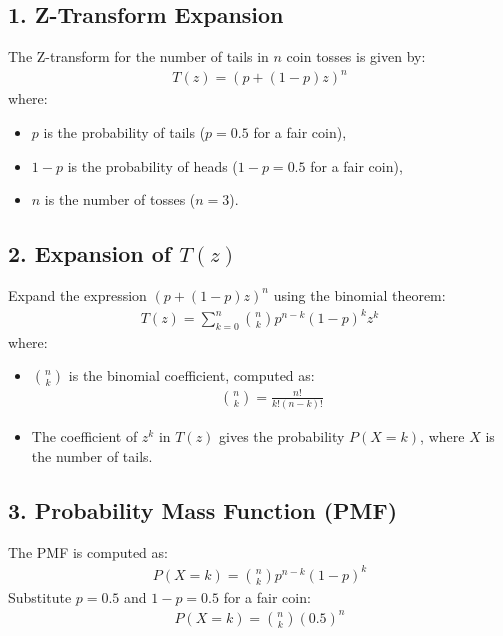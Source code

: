 \documentclass[journal]{IEEEtran}
\begin{document}
\subsection*{1. Z-Transform Expansion}
The Z-transform for the number of tails in \(n\) coin tosses is given by:
\begin{align}
T(z) = \left( p + (1-p)z \right)^n
\end{align}
where:
\begin{itemize}
    \item \(p\) is the probability of tails (\(p = 0.5\) for a fair coin),
    \item \(1-p\) is the probability of heads (\(1-p = 0.5\) for a fair coin),
    \item \(n\) is the number of tosses (\(n = 3\)).
\end{itemize}

\subsection*{2. Expansion of \(T(z)\)}
Expand the expression \(\left( p + (1-p)z \right)^n\) using the binomial theorem:
\begin{align}
T(z) = \sum_{k=0}^{n} \binom{n}{k} p^{n-k} (1-p)^k z^k
\end{align}
where:
\begin{itemize}
    \item \(\binom{n}{k}\) is the binomial coefficient, computed as:
    \begin{align}
    \binom{n}{k} = \frac{n!}{k! (n-k)!}
    \end{align}
    \item The coefficient of \(z^k\) in \(T(z)\) gives the probability \(P(X = k)\), where \(X\) is the number of tails.
\end{itemize}

\subsection*{3. Probability Mass Function (PMF)}
The PMF is computed as:
\begin{align}
P(X = k) = \binom{n}{k} p^{n-k} (1-p)^k
\end{align}
Substitute \(p = 0.5\) and \(1-p = 0.5\) for a fair coin:
\begin{align}
P(X = k) = \binom{n}{k} (0.5)^n
\end{align}
\end{document}
